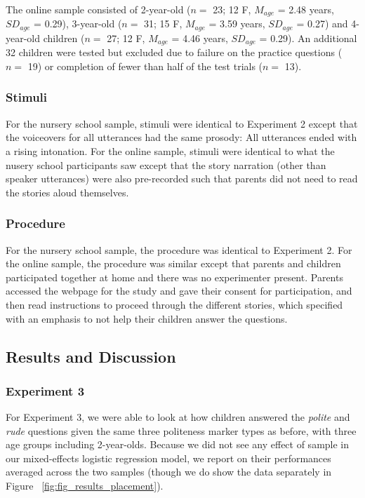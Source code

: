 \documentclass[10pt, letterpaper]{article}
\begin{document}
The online sample consisted of 2-year-old (\(n=\) 23; 12 F, \(M_{age}\)
= 2.48 years, \(SD_{age}\) = 0.29), 3-year-old (\(n=\) 31; 15 F,
\(M_{age}\) = 3.59 years, \(SD_{age}\) = 0.27) and 4-year-old children
(\(n=\) 27; 12 F, \(M_{age}\) = 4.46 years, \(SD_{age}\) = 0.29). An
additional 32 children were tested but excluded due to failure on the
practice questions (\(n=\) 19) or completion of fewer than half of the
test trials (\(n=\) 13).

\subsubsection{Stimuli}\label{stimuli}

For the nursery school sample, stimuli were identical to Experiment 2
except that the voiceovers for all utterances had the same prosody: All
utterances ended with a rising intonation. For the online sample,
stimuli were identical to what the nusery school participants saw except
that the story narration (other than speaker utterances) were also
pre-recorded such that parents did not need to read the stories aloud
themselves.

\subsubsection{Procedure}\label{procedure-2}

For the nursery school sample, the procedure was identical to Experiment
2. For the online sample, the procedure was similar except that parents
and children participated together at home and there was no experimenter
present. Parents accessed the webpage for the study and gave their
consent for participation, and then read instructions to proceed through
the different stories, which specified with an emphasis to not help
their children answer the questions.

\subsection{Results and Discussion}\label{results-and-discussion-2}

\subsubsection{Experiment 3}\label{experiment-3-1}

For Experiment 3, we were able to look at how children answered the
\emph{polite} and \emph{rude} questions given the same three politeness
marker types as before, with three age groups including 2-year-olds.
Because we did not see any effect of sample in our mixed-effects
logistic regression model, we report on their performances averaged
across the two samples (though we do show the data separately in Figure
~\ref{fig:fig_results_placement}).
\end{document}
